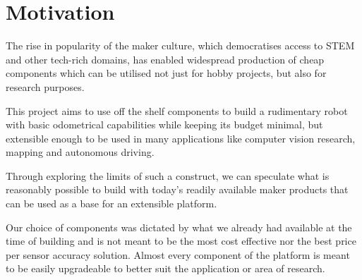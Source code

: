 \documentclass[class=article, crop=false]{standalone}
\begin{document}
\chapter{Motivation}\label{cha:motivation}

The rise in popularity of the maker culture, which democratises access to STEM and other tech-rich domains, has enabled widespread production of cheap components which can be utilised not just for hobby projects, but also for research purposes.

This project aims to use off the shelf components to build a rudimentary robot with basic odometrical capabilities while keeping its budget minimal, but extensible enough to be used in many applications like computer vision research, mapping and autonomous driving.

Through exploring the limits of such a construct, we can speculate what is reasonably possible to build with today's readily available maker products that can be used as a base for an extensible platform.

Our choice of components was dictated by what we already had available at the time of building and is not meant to be the most cost effective nor the best price per sensor accuracy solution. Almost every component of the platform is meant to be easily upgradeable to better suit the application or area of research.

\clearpage
\end{document}
